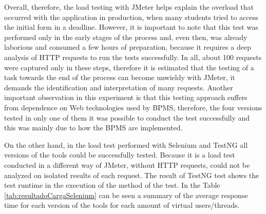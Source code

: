 \documentclass[runningheads,a4paper]{llncs}
\begin{document}

Overall, therefore, the load testing with JMeter helps explain the overload that occurred with the application in production, when many students tried to access the initial form in a deadline. However, it is important to note that this test was performed only in the early stages of the process and, even then, was already laborious and consumed a few hours of preparation, because it requires a deep analysis of HTTP requests to run the tests successfully. In all, about 100 requests were captured only in these steps, therefore it is estimated that the testing of a task towards the end of the process can become unwieldy with JMeter, it demands the identification and interpretation of many requests. Another important observation in this experiment is that this testing approach suffers from dependence on Web technologies used by BPMS, therefore, the four versions tested in only one of them it was possible to conduct the test successfully and this was mainly due to how the BPMS are implemented.


On the other hand, in the load test performed with Selenium and TestNG all versions of the tools could be successfully tested. Because it is a load test conducted in a different way of JMeter, without HTTP requests, could not be analyzed on isolated results of each request. The result of TestNG test shows the test runtime in the execution of the method of the test. In the Table \ref{tab:resultadoCargaSelenium} can be seen a summary of the average response time for each version of the tools for each amount of virtual users/threads.
\end{document}
